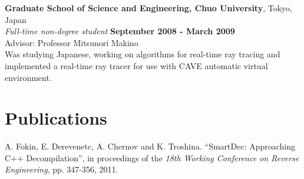 \documentclass[margin,line]{CV}
\begin{document}
\begin{resume}
    \textbf{Graduate School of Science and Engineering, Chuo University}, Tokyo, Japan \vspace{2mm}\\\vspace{1mm}%
    \textsl{Full-time non-degree student} \hfill \textbf{September 2008 - March 2009}\vspace{1mm}\\
    Advisor: Professor Mitsunori Makino \\
    Was studying Japanese, working on algorithms for real-time ray tracing and implemented a real-time ray tracer for use with CAVE automatic virtual environment.

    




    \section{\mysidestyle Publications}
    A. Fokin, E. Derevenetc, A. Chernov and K. Troshina. ``SmartDec: Approaching C++ Decompilation'',
    in proceedings of the \textsl{18th Working Conference on Reverse Engineering}, pp. 347-356, 2011.


\end{resume}
\end{document}
